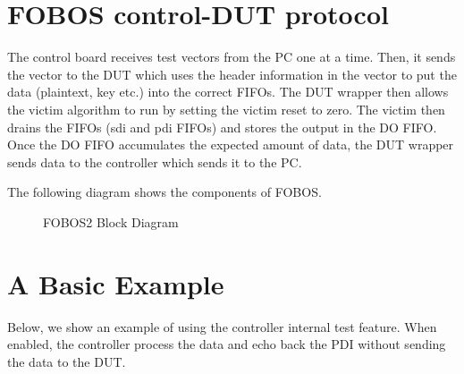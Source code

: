 \documentclass[letterpaper,10pt,english]{sphinxmanual}
\begin{document}
\section{FOBOS control-DUT protocol}
\label{\detokenize{capture_data:fobos-control-dut-protocol}}
The control board receives test vectors from the PC one at a time. Then, it sends the vector to the DUT
which uses the header information in the vector to put the data (plaintext, key etc.) into the correct FIFOs.
The DUT wrapper then allows the victim algorithm to run by setting the victim reset to zero. The victim then drains the FIFOs
(sdi and pdi FIFOs) and stores the output in the DO FIFO. Once the DO FIFO accumulates the expected amount of data,
the DUT wrapper sends data to the controller which sends it to the PC.

The following diagram shows the components of FOBOS.

\begin{figure}[htbp]
\centering
\capstart

\noindent{}
\caption{FOBOS2 Block Diagram}\label{\detokenize{capture_data:id1}}\end{figure}


\section{A Basic Example}
\label{\detokenize{capture_data:a-basic-example}}
Below, we show an example of using the controller internal test feature. When enabled, the controller process the data and echo back the
PDI without sending the data to the DUT.
\end{document}

